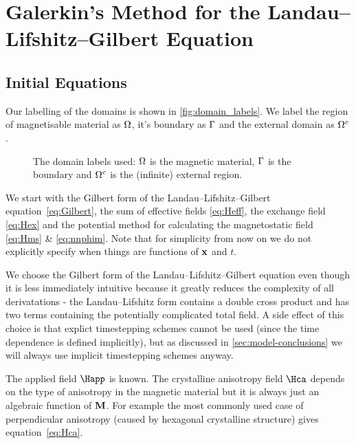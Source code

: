 \chapter{Galerkin's Method for the Landau--Lifshitz--Gilbert Equation}
\label{sec:galerk-meth-llg}

\section{Initial Equations}
\label{sec:llg-initial-equations}

Our labelling of the domains is shown in \autoref{fig:domain_labels}. We label the region of magnetisable material as $\Omega$, it's boundary as ${\Gamma}$ and the external domain as ${\Omega^c}$.

\begin{figure}[!ht]
  \center
  \caption{The domain labels used: $\Omega$ is the magnetic material, ${\Gamma}$ is the boundary and ${\Omega^c}$ is the (infinite) external region.} \label{fig:domain_labels}
\end{figure}

We start with the Gilbert form of the Landau--Lifshitz--Gilbert equation~\eqref{eq:Gilbert}, the sum of effective fields \eqref{eq:Heff}, the exchange field \eqref{eq:Hex} and the potential method for calculating the magnetostatic field \eqref{eq:Hms} \& \eqref{eq:nnphim}. Note that for simplicity from now on we do not explicitly specify when things are functions of $\mathbf{x}$ and $t$.

We choose the Gilbert form of the Landau--Lifshitz--Gilbert equation even though it is less immediately intuitive because it greatly reduces the complexity of all derivatations - the Landau--Lifshitz form contains a double cross product and has two terms containing the potentially complicated total field. A side effect of this choice is that explict timestepping schemes cannot be used (since the time dependence is defined implicitly), but as discussed in \autoref{sec:model-conclusions} we will always use implicit timestepping schemes anyway.

The applied field $\Happ$ is known. The crystalline anisotropy field $\Hca$ depends on the type of anisotropy in the magnetic material but it is always just an algebraic function of $\mathbf{M}$. For example the most commonly used case of perpendicular anisotropy (caused by hexagonal crystalline structure) gives equation~\eqref{eq:Hca}.

